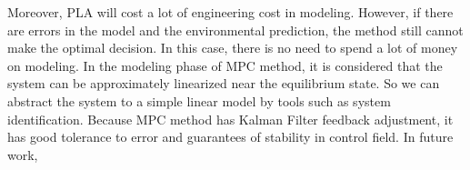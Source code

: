 \documentclass[sigconf]{acmart}
\begin{document}
Moreover, PLA will cost a lot of engineering cost in modeling.
However, if there are errors in the model and the environmental prediction, the method still cannot make the optimal decision. In this case, there is no need to spend a lot of money on modeling.
In the modeling phase of MPC method, it is considered that the system can be approximately linearized near the equilibrium state. So we can abstract the system to a simple linear model by tools such as system identification. 
Because MPC method has Kalman Filter feedback adjustment, it has good tolerance to error and guarantees of stability in control field.
In future work,


\end{document}
